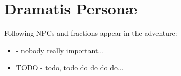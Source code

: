 \section{Dramatis Person\ae}
\label{personae}

Following NPCs and fractions appear in the adventure:

\begin{itemize}
	\item \npcHoid[s]{} - nobody really important...
	
	\item TODO - todo, todo do do do do...
\end{itemize}

